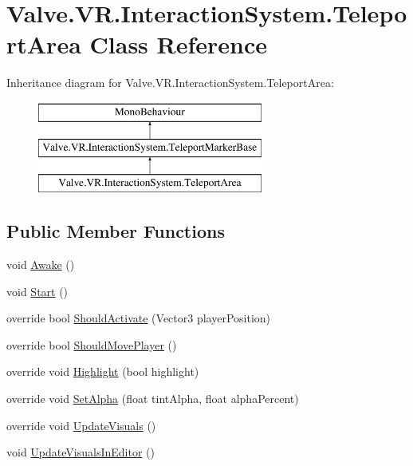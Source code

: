 \hypertarget{class_valve_1_1_v_r_1_1_interaction_system_1_1_teleport_area}{}\section{Valve.\+V\+R.\+Interaction\+System.\+Teleport\+Area Class Reference}
\label{class_valve_1_1_v_r_1_1_interaction_system_1_1_teleport_area}
Inheritance diagram for Valve.\+V\+R.\+Interaction\+System.\+Teleport\+Area\+:\begin{figure}[H]
\begin{center}
\leavevmode
\includegraphics[height=3.000000cm]{class_valve_1_1_v_r_1_1_interaction_system_1_1_teleport_area}
\end{center}
\end{figure}
\subsection*{Public Member Functions}
\begin{DoxyCompactItemize}
\item 
void \mbox{\hyperlink{class_valve_1_1_v_r_1_1_interaction_system_1_1_teleport_area_a721494a75b2e6cdabebe375b65bca58e}{Awake}} ()
\item 
void \mbox{\hyperlink{class_valve_1_1_v_r_1_1_interaction_system_1_1_teleport_area_abf4db69deb14ee86ecc61a6580b8437f}{Start}} ()
\item 
override bool \mbox{\hyperlink{class_valve_1_1_v_r_1_1_interaction_system_1_1_teleport_area_ad9af038ae8e61a6494ce9dc42f902395}{Should\+Activate}} (Vector3 player\+Position)
\item 
override bool \mbox{\hyperlink{class_valve_1_1_v_r_1_1_interaction_system_1_1_teleport_area_ad2785af739ebe7063eb636f0c8978a8e}{Should\+Move\+Player}} ()
\item 
override void \mbox{\hyperlink{class_valve_1_1_v_r_1_1_interaction_system_1_1_teleport_area_af6ccf32a483c32ef856b1f8a56bface5}{Highlight}} (bool highlight)
\item 
override void \mbox{\hyperlink{class_valve_1_1_v_r_1_1_interaction_system_1_1_teleport_area_ae510f0958167635ad57ebab1a16bdd38}{Set\+Alpha}} (float tint\+Alpha, float alpha\+Percent)
\item 
override void \mbox{\hyperlink{class_valve_1_1_v_r_1_1_interaction_system_1_1_teleport_area_a385c0b75611a1d7b120fc5e45e69730e}{Update\+Visuals}} ()
\item 
void \mbox{\hyperlink{class_valve_1_1_v_r_1_1_interaction_system_1_1_teleport_area_adac79e154fb040c95d9d842aa5a1fe23}{Update\+Visuals\+In\+Editor}} ()
\end{DoxyCompactItemize}
